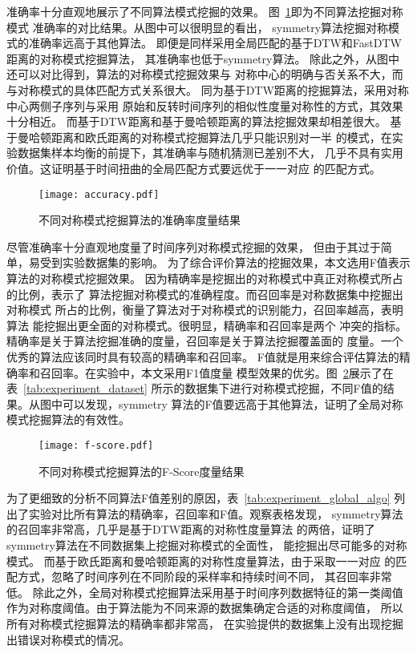 准确率十分直观地展示了不同算法模式挖掘的效果。
图~\ref{fig:accuracy_compare}即为不同算法挖掘对称模式
准确率的对比结果。从图中可以很明显的看出，
symmetry算法挖掘对称模式的准确率远高于其他算法。
即便是同样采用全局匹配的基于DTW和FastDTW距离的对称模式挖掘算法，
其准确率也低于symmetry算法。
除此之外，从图中还可以对比得到，算法的对称模式挖掘效果与
对称中心的明确与否关系不大，而与对称模式的具体匹配方式关系很大。
同为基于DTW距离的挖掘算法，采用对称中心两侧子序列与采用
原始和反转时间序列的相似性度量对称性的方式，其效果十分相近。
而基于DTW距离和基于曼哈顿距离的算法挖掘效果却相差很大。
基于曼哈顿距离和欧氏距离的对称模式挖掘算法几乎只能识别对一半
的模式，在实验数据集样本均衡的前提下，其准确率与随机猜测已差别不大，
几乎不具有实用价值。这证明基于时间扭曲的全局匹配方式要远优于一一对应
的匹配方式。
\begin{figure}
  \centering
  \texttt{[image: accuracy.pdf]}
  \caption{不同对称模式挖掘算法的准确率度量结果}
  \label{fig:accuracy_compare}
\end{figure}

尽管准确率十分直观地度量了时间序列对称模式挖掘的效果，
但由于其过于简单，易受到实验数据集的影响。
为了综合评价算法的挖掘效果，本文选用F值表示算法的对称模式挖掘效果。
因为精确率是挖掘出的对称模式中真正对称模式所占的比例，表示了
算法挖掘对称模式的准确程度。而召回率是对称数据集中挖掘出对称模式
所占的比例，衡量了算法对于对称模式的识别能力，召回率越高，表明算法
能挖掘出更全面的对称模式。很明显，精确率和召回率是两个
冲突的指标。精确率是关于算法挖掘准确的度量，召回率是关于算法挖掘覆盖面的
度量。一个优秀的算法应该同时具有较高的精确率和召回率。
F值就是用来综合评估算法的精确率和召回率。在实验中，本文采用F1值度量
模型效果的优劣。图~\ref{fig:fscore_compare}展示了在表~\ref{tab:experiment_dataset}
所示的数据集下进行对称模式挖掘，不同F值的结果。从图中可以发现，symmetry
算法的F值要远高于其他算法，证明了全局对称模式挖掘算法的有效性。
\begin{figure}
  \centering
  \texttt{[image: f-score.pdf]}
  \caption{不同对称模式挖掘算法的F-Score度量结果}
  \label{fig:fscore_compare}
\end{figure}

为了更细致的分析不同算法F值差别的原因，表~\ref{tab:experiment_global_algo}
列出了实验对比所有算法的精确率，召回率和F值。观察表格发现，
symmetry算法的召回率非常高，几乎是基于DTW距离的对称性度量算法
的两倍，证明了symmetry算法在不同数据集上挖掘对称模式的全面性，
能挖掘出尽可能多的对称模式。
而基于欧氏距离和曼哈顿距离的对称性度量算法，由于采取一一对应
的匹配方式，忽略了时间序列在不同阶段的采样率和持续时间不同，
其召回率非常低。
除此之外，全局对称模式挖掘算法采用基于时间序列数据特征的第一类阈值
作为对称度阈值。由于算法能为不同来源的数据集确定合适的对称度阈值，
所以所有对称模式挖掘算法的精确率都非常高，
在实验提供的数据集上没有出现挖掘出错误对称模式的情况。


